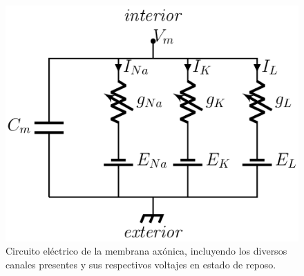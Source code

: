 \begin{figure}[h]
 \centering
 \includegraphics[scale=0.5]{../Figuras/circuito.png}
 \caption{Circuito eléctrico de la membrana axónica, incluyendo los diversos canales presentes y sus respectivos voltajes en estado de reposo.}
 \label{fig:circuito}
\end{figure}

